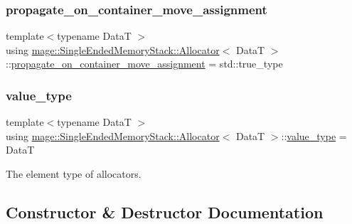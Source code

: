 \subsubsection{\texorpdfstring{propagate\+\_\+on\+\_\+container\+\_\+move\+\_\+assignment}{propagate\_on\_container\_move\_assignment}}
{\footnotesize\ttfamily template$<$typename DataT $>$ \\
using \hyperlink{classmage_1_1_single_ended_memory_stack_1_1_allocator}{mage\+::\+Single\+Ended\+Memory\+Stack\+::\+Allocator}$<$ DataT $>$\+::\hyperlink{classmage_1_1_single_ended_memory_stack_1_1_allocator_a408c0a4b29dc60e9564245c6a0a6fd4c}{propagate\+\_\+on\+\_\+container\+\_\+move\+\_\+assignment} =  std\+::true\+\_\+type}

\hypertarget{classmage_1_1_single_ended_memory_stack_1_1_allocator_a4d5b98a534ad4e6d6f2d8eb1280398ab}{}\label{classmage_1_1_single_ended_memory_stack_1_1_allocator_a4d5b98a534ad4e6d6f2d8eb1280398ab} 
\subsubsection{\texorpdfstring{value\+\_\+type}{value\_type}}
{\footnotesize\ttfamily template$<$typename DataT $>$ \\
using \hyperlink{classmage_1_1_single_ended_memory_stack_1_1_allocator}{mage\+::\+Single\+Ended\+Memory\+Stack\+::\+Allocator}$<$ DataT $>$\+::\hyperlink{classmage_1_1_single_ended_memory_stack_1_1_allocator_a4d5b98a534ad4e6d6f2d8eb1280398ab}{value\+\_\+type} =  DataT}

The element type of allocators. 

\subsection{Constructor \& Destructor Documentation}
\hypertarget{classmage_1_1_single_ended_memory_stack_1_1_allocator_acc7f17e870881240ee354efe69f9ba34}{}\label{classmage_1_1_single_ended_memory_stack_1_1_allocator_acc7f17e870881240ee354efe69f9ba34} 
